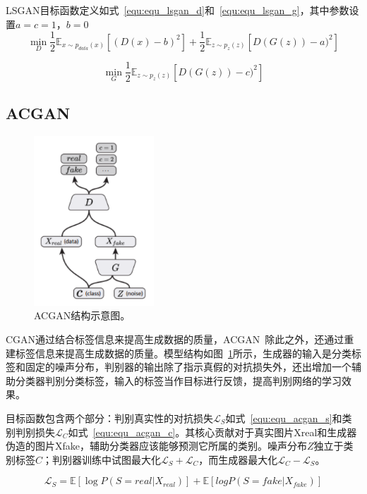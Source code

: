 LSGAN目标函数定义如式~\ref{equ:equ_lsgan_d}和~\ref{equ:equ_lsgan_g}，其中参数设置$a=c=1$，$b=0$
\begin{equation}
\label{equ:equ_lsgan_d}
\min \limits_D \frac{1}{2} \mathbb{E}_{x \sim p_{data}(x)}[(D(x)-b)^2] + \frac{1}{2} \mathbb{E}_{z \sim{p_z(z)}}[D(G(z))-a)^2]
\end{equation}

\begin{equation}
\label{equ:equ_lsgan_g}
\min \limits_G\frac{1}{2}\mathbb{E}_{z \sim{p_z(z)}}[D(G(z))-c)^2]
\end{equation}


\subsection{ACGAN}
\begin{figure}[ht]
    \centering
	\includegraphics[width=0.4\textwidth]{figures/acgan.pdf}
	\caption{ACGAN结构示意图。}
	\label{fig:pic_acgan}
\end{figure}

CGAN通过结合标签信息来提高生成数据的质量，ACGAN~\cite{odena2017conditional}除此之外，还通过重建标签信息来提高生成数据的质量。模型结构如图~\ref{fig:pic_acgan}所示，生成器的输入是分类标签和固定的噪声分布，判别器的输出除了指示真假的对抗损失外，还出增加一个辅助分类器判别分类标签，输入的标签当作目标进行反馈，提高判别网络的学习效果。

目标函数包含两个部分：判别真实性的对抗损失$\mathcal{L}_S$如式~\ref{equ:equ_acgan_s}和类别判别损失$\mathcal{L}_C$如式~\ref{equ:equ_acgan_c}。其核心贡献对于真实图片Xreal和生成器伪造的图片Xfake，辅助分类器应该能够预测它所属的类别。噪声分布$Z$独立于类别标签$C$；判别器训练中试图最大化$\mathcal{L}_S+\mathcal{L}_C$，而生成器最大化$\mathcal{L}_C-\mathcal{L}_S$。

\begin{equation}
\label{equ:equ_acgan_s}
\mathcal{L}_S = \mathbb{E}[\log P(S = real | X_{real})] + \mathbb{E}[logP(S = fake | X_{fake})]
\end{equation}

